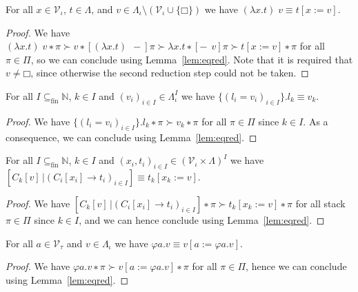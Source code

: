 \begin{theorem}
  For all $x ∈ \mathcal{V}_{ι}$, $t ∈ Λ$, and $v ∈ Λ_{ι} \setminus
  (\mathcal{V}_{ι} ∪ \{□\})$ we have $(λx.t)\;v ≡ t[x := v]$.
\end{theorem}
\begin{proof}
  We have ${(λx.t)\;v ∗ π} ≻ {v ∗ [(λx.t)\;\,{-}]π} ≻ {λx.t ∗ [{-}\;\,v]π} ≻
  t[x := v] ∗ π$ for all $π ∈ Π$, so we can conclude using Lemma~\ref{lem:eqred}.
  Note that it is required that $v ≠ □$, since otherwise the second reduction
  step could not be taken.
\end{proof}

\begin{theorem}
  For all $I ⊆_{\text{fin}} \mathbb{N}$, $k ∈ I$ and $(v_i)_{i∈I} ∈ Λ_{ι}^I$
  we have $\{(l_i = v_i)_{i∈I}\}.l_k ≡ v_k$.
\end{theorem}
\begin{proof}
  We have ${\{(l_i = v_i)_{i∈I}\}.l_k ∗ π} ≻ {v_k ∗ π}$ for all $π ∈ Π$ since
  $k ∈ I$. As a consequence, we can conclude using Lemma~\ref{lem:eqred}.
\end{proof}

\begin{theorem}
  For all $I ⊆_{\text{fin}} \mathbb{N}$, $k ∈ I$ and $(x_i, t_i)_{i ∈ I} ∈
  (\mathcal{V}_{ι} × Λ)^I$ we have  $[C_k[v]\,| (C_i[x_i] → t_i)_{i∈I}] ≡
  t_k[x_k := v]$.
\end{theorem}
\begin{proof}
  We have ${[C_k[v]\,| (C_i[x_i] → t_i)_{i∈I}] ∗ π} ≻ {t_k[x_k := v] ∗ π}$
  for all stack $π ∈ Π$ since $k ∈ I$, and we can hence conclude using
  Lemma~\ref{lem:eqred}.
\end{proof}

\begin{theorem}
  For all $a ∈ \mathcal{V}_{τ}$ and $v ∈ Λ_{ι}$ we have
  ${φa.v} ≡ {v[a := φa.v]}$.
\end{theorem}
\begin{proof}
  We have ${φa.v ∗ π} ≻ {v[a := φa.v] ∗ π}$ for all $π ∈ Π$, hence we can
  conclude using Lemma~\ref{lem:eqred}.
\end{proof}

